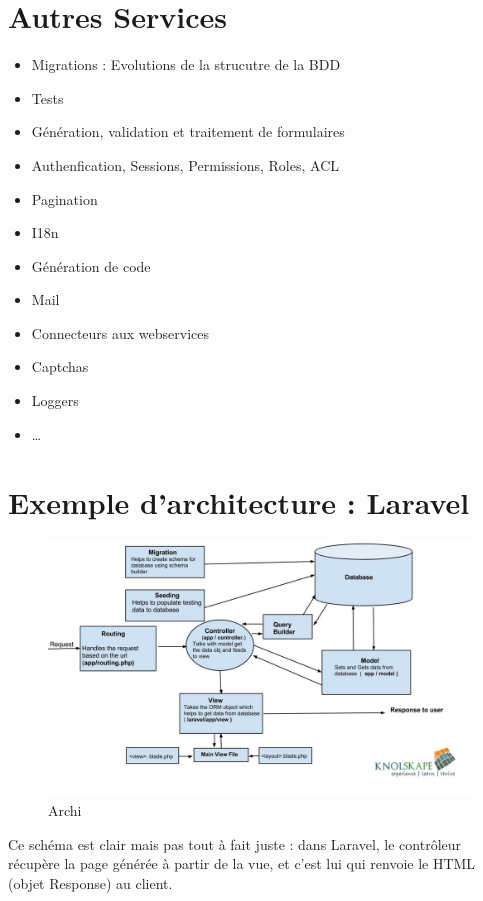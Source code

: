 \hypertarget{autres-services}{%
\section{Autres Services}\label{autres-services}}

\begin{itemize}
\tightlist
\item
  Migrations : Evolutions de la strucutre de la BDD
\item
  Tests
\item
  Génération, validation et traitement de formulaires
\item
  Authenfication, Sessions, Permissions, Roles, ACL
\item
  Pagination
\item
  I18n
\item
  Génération de code
\item
  Mail
\item
  Connecteurs aux webservices
\item
  Captchas
\item
  Loggers
\item
  \ldots{}
\end{itemize}

\hypertarget{exemple-darchitecture-laravel}{%
\section{Exemple d'architecture :
Laravel}\label{exemple-darchitecture-laravel}}

\begin{figure}
\centering
\includegraphics{src/img/laravel-architecture.jpg}
\caption{Archi}
\end{figure}

Ce schéma est clair mais pas tout à fait juste : dans Laravel, le
contrôleur récupère la page générée à partir de la vue, et c'est lui qui
renvoie le HTML (objet Response) au client.

